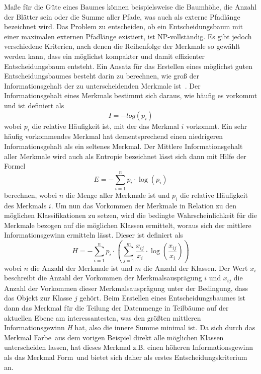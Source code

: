 Maße für die Güte eines Baumes können beispielsweise die Baumhöhe, die Anzahl der Blätter sein oder die Summe aller Pfade, was auch als externe Pfadlänge bezeichnet wird. Das Problem zu entscheiden, ob ein Entscheidungsbaum mit einer maximalen externen Pfadlänge existiert, ist NP-vollständig. Es gibt jedoch verschiedene Kriterien, nach denen die Reihenfolge der Merkmale so gewählt werden kann, dass ein möglichst kompakter und damit effizienter Entscheidungsbaum entsteht. Ein Ansatz für das Erstellen eines möglichst guten Entscheidungsbaumes besteht darin zu berechnen, wie groß der Informationsgehalt der zu unterscheidenden Merkmale ist~\cite{Shannon}. Der Informationsgehalt eines Merkmals bestimmt sich daraus, wie häufig es vorkommt und ist definiert als 
\[I = -log(p_i)\] wobei $p_i$ die relative Häufigkeit ist, mit der das Merkmal $i$ vorkommt. Ein sehr häufig vorkommendes Merkmal hat dementsprechend einen niedrigeren Informationsgehalt als ein seltenes Merkmal. Der Mittlere Informationsgehalt aller Merkmale wird auch als Entropie bezeichnet lässt sich dann mit Hilfe der Formel 
\[E = - \sum \limits_{i=1}^n p_i \cdot \log (p_i)\] berechnen, wobei $n$ die Menge aller Merkmale ist und $p_i$ die relative Häufigkeit des Merkmals $i$.
Um nun das Vorkommen der Merkmale in Relation zu den möglichen Klassifikationen zu setzen, wird die bedingte Wahrscheinlichkeit für die Merkmale bezogen auf die möglichen Klassen ermittelt, woraus sich der mittlere Informationsgewinn ermitteln lässt. Dieser ist definiert als 
\[H = - \sum \limits_{i=1}^n p_i \cdot \left( \sum \limits_{j=1}^m \frac{x_{ij}}{x_i} \cdot \log (\frac{x_{ij}}{x_i})\right) \] wobei $n$ die Anzahl der Merkmale ist und $m$ die Anzahl der Klassen. Der Wert $x_i$ beschreibt die Anzahl der Vorkommen der Merkmalsausprägung $i$ und $x_{ij}$ die Anzahl der Vorkommen dieser Merkmalsausprägung unter der Bedingung, dass das Objekt zur Klasse $j$ gehört.
Beim Erstellen eines Entscheidungsbaumes ist dann das Merkmal für die Teilung der Datenmenge in Teilbäume auf der aktuellen Ebene am interessantesten, was den größten mittleren Informationsgewinn \textit{H} hat, also die innere Summe minimal ist.
Da sich durch das Merkmal \glqq Farbe\grqq\ aus dem vorigen Beispiel direkt alle möglichen Klassen unterscheiden lassen, hat dieses Merkmal z.B. einen höheren Informationsgewinn als das Merkmal \glqq Form\grqq\ und bietet sich daher als erstes Entscheidungskriterium an.

